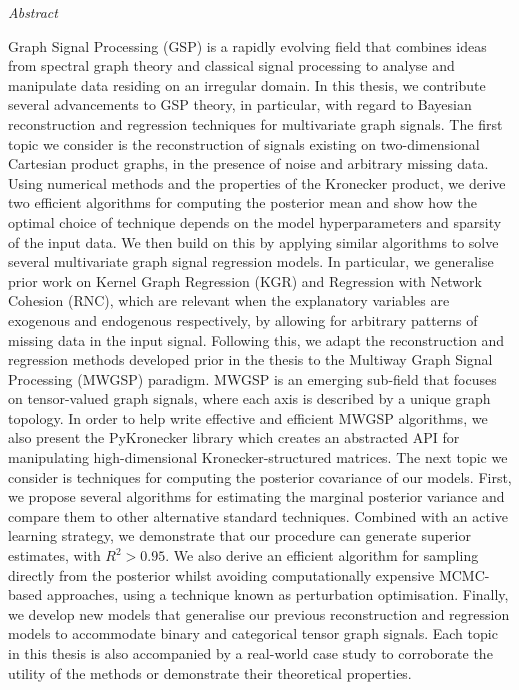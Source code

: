 \pagestyle{empty}



\begin{center}
    \hspace{-1cm}
    {\LARGE{\textit{Abstract}}}
\end{center}
 

Graph Signal Processing (GSP) is a rapidly evolving field that combines ideas from spectral graph theory and classical signal processing to analyse and manipulate data residing on an irregular domain. In this thesis, we contribute several advancements to GSP theory, in particular, with regard to Bayesian reconstruction and regression techniques for multivariate graph signals. The first topic we consider is the reconstruction of signals existing on two-dimensional Cartesian product graphs, in the presence of noise and arbitrary missing data. Using numerical methods and the properties of the Kronecker product, we derive two efficient algorithms for computing the posterior mean and show how the optimal choice of technique depends on the model hyperparameters and sparsity of the input data. We then build on this by applying similar algorithms to solve several multivariate graph signal regression models. In particular, we generalise prior work on Kernel Graph Regression (KGR) and Regression with Network Cohesion (RNC), which are relevant when the explanatory variables are exogenous and endogenous respectively, by allowing for arbitrary patterns of missing data in the input signal. Following this, we adapt the reconstruction and regression methods developed prior in the thesis to the Multiway Graph Signal Processing (MWGSP) paradigm. MWGSP is an emerging sub-field that focuses on tensor-valued graph signals, where each axis is described by a unique graph topology. In order to help write effective and efficient MWGSP algorithms, we also present the PyKronecker library which creates an abstracted API for manipulating high-dimensional Kronecker-structured matrices. The next topic we consider is techniques for computing the posterior covariance of our models. First, we propose several algorithms for estimating the marginal posterior variance and compare them to other alternative standard techniques. Combined with an active learning strategy, we demonstrate that our procedure can generate superior estimates, with $R^2 > 0.95$. We also derive an efficient algorithm for sampling directly from the posterior whilst avoiding computationally expensive MCMC-based approaches, using a technique known as perturbation optimisation. Finally, we develop new models that generalise our previous reconstruction and regression models to accommodate binary and categorical tensor graph signals. Each topic in this thesis is also accompanied by a real-world case study to corroborate the utility of the methods or demonstrate their theoretical properties. 


\clearpage %